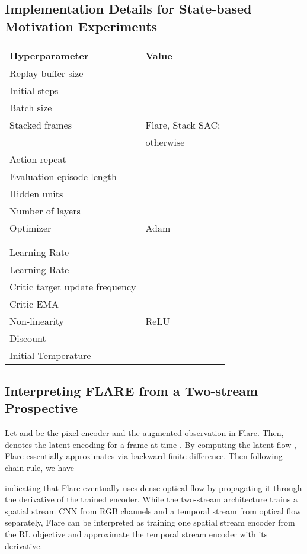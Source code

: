 \documentclass{article} \usepackage{iclr2021_conference,times}
\begin{document}
\subsection{Implementation Details for State-based Motivation Experiments}

\begin{center}
\begin{tabular}{l l}
 \hline
 \textbf{Hyperparameter} & \textbf{Value} \\ [0.5ex] 
 \hline
 Replay buffer size &  \\
 Initial steps &  \\
 Batch size &  \\
 Stacked frames &  Flare, Stack SAC;  \\
                &  otherwise \\
 Action repeat &  \\
 Evaluation episode length &  \\
 Hidden units &  \\
 Number of layers &  \\ 
 Optimizer & Adam \\
  &  \\
  &  \\
 Learning Rate  &  \\
 Learning Rate  &  \\ 
 Critic target update frequency & \\
 Critic EMA  &  \\
 Non-linearity & ReLU \\
 Discount  &  \\
 Initial Temperature &  \\
 \hline
\end{tabular}
\end{center}

\subsection{Interpreting FLARE from a Two-stream Prospective} \label{sec: two-stream_flare}
Let  and   be the pixel encoder and the augmented observation in Flare. Then,  denotes the latent encoding for a frame at time . By computing the latent flow , Flare essentially approximates  via backward finite difference. Then following chain rule, we have

indicating that Flare eventually uses dense optical flow by propagating it through the derivative of the trained encoder. While the two-stream architecture trains a spatial stream CNN from RGB channels and a temporal stream from optical flow separately, Flare can be interpreted as training one spatial stream encoder from the RL objective and approximate the temporal stream encoder with its derivative.
 
\end{document}
